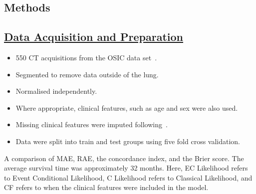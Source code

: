 \documentclass[portrait, color=UCLburgundy, margin=1cm]{uclposter}
\begin{document}
\begin{multicols}{2}
        \section*{Methods}
            \subsection*{\underline{\textbf{Data Acquisition and Preparation}}}
                \begin{itemize}
                    \item 550 \gls{CT} acquisitions from the \gls{OSIC} data set~\cite{OSICOSICRepository}.
                    
                    \item Segmented to remove data outside of the lung.
                    
                    \item Normalised independently.
                    
                    \item Where appropriate, clinical features, such as age and sex were also used.
                    
                    \item Missing clinical features were imputed following~\cite{Shahin2022SurvivalData}.
                    
                    \item Data were split into train and test groups using five fold cross validation.
                \end{itemize}

        \begin{table}[H]
            \centering
            
            \captionsetup{singlelinecheck=false, justification=centering}
            \begin{highlightbox}[UCLlightblue]
                \caption{
                    A comparison of \gls{MAE}, \gls{RAE}, the concordance index, and the Brier score. The average survival time was approximately 32 months. Here, EC Likelihood refers to Event Conditional Likelihood, C Likelihood refers to Classical Likelihood, and CF refers to when the clinical features were included in the model.
                }
            \end{highlightbox}
            

\end{table}
\end{multicols}
\end{document}
